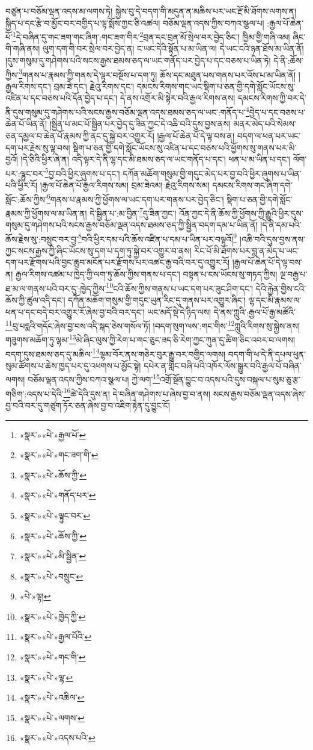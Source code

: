 བཙུན་པ་བཅོམ་ལྡན་འདས་མ་ལགས་ཏེ། སྐྱེས་བུ་དེ་བདག་གི་མདུན་ན་མཆིས་པར་ཡང་རྔོ་མི་ཐོགས་ལགས་ན། སྐྱིད་པ་དང་རྩེ་བ་མྱོང་བར་བགྱིད་པ་ལྟ་སྨོས་ཀྱང་ཅི་འཚལ། བཅོམ་ལྡན་འདས་ཀྱིས་བཀའ་སྩལ་པ། :རྒྱལ་པོ་ཆེན་པོ་\footnote{«སྣར་»«པེ་»རྒྱལ་པོ་}དེ་བཞིན་དུ་གང་ཟག་གང་ཞིག་:གང་ཟག་གིར་\footnote{«སྣར་»«པེ་»གང་ཟག་གི་}བྲན་དང་བྲན་མོ་སྲེལ་བར་བྱེད་ཅིང་། ཁྱིམ་གྱི་གཞི་འམ། ཞིང་གི་གཞི་ནས། ལུག་དག་གི་བར་སྲེལ་བར་བྱེད་ན། ང་ཡང་དེའི་སྟོན་པ་མ་ཡིན་ལ། དེ་ཡང་ངའི་ཉན་ཐོས་མ་ཡིན་ནོ། །དུས་གསུམ་དུ་གཤེགས་པའི་སངས་རྒྱས་ཐམས་ཅད་ལ་ཡང་གནོད་པར་བྱེད་པ་དང་བཅས་པ་ཡིན་ཏེ། དེ་ནི་:ཆོས་ཀྱིས་\footnote{«སྣར་»«པེ་»ཆོས་ཀྱི་}གནས་པ་རྣམས་ཀྱི་གནས་དེ་ལྟར་བསྔོས་པ་དག་ཏུ། ཆོས་དང་མཐུན་པས་གནས་པར་འོས་པ་མ་ཡིན་ནོ། །རྒྱལ་རིགས་དང་། བྲམ་ཟེ་དང་། རྗེའུ་རིགས་དང་། དམངས་རིགས་གང་ཡང་སྡིག་པ་ཅན་གྱི་དགེ་སློང་ཡོངས་སུ་འཛིན་པ་དང་བཅས་པའི་དོན་བྱེད་པ་དང་། དེ་ནས་འགྲོར་མི་སྟེར་བའི་རྒྱལ་རིགས་ནས། དམངས་རིགས་ཀྱི་བར་དེ་ནི་དུས་གསུམ་དུ་གཤེགས་པའི་སངས་རྒྱས་བཅོམ་ལྡན་འདས་ཐམས་ཅད་ལ་ཡང་:གནོད་པ་\footnote{«སྣར་»«པེ་»གནོད་པར་}བྱེད་པ་དང་བཅས་པ་ཆེན་པོ་ཡིན་ནོ། །སྦྱིན་པ་མང་པོ་སྦྱིན་པར་བྱེད་དུ་ཟིན་ཀྱང་དེ་འཆི་བའི་དུས་བྱས་ནས། མནར་མེད་པའི་སེམས་ཅན་དམྱལ་བ་ཆེན་པོ་རྣམས་ཀྱི་ནང་དུ་སྐྱེ་བར་འགྱུར་རོ། །རྒྱལ་པོ་ཆེན་པོ་དེ་ལྟ་བས་ན། བདག་ལ་ཕན་པར་ཡང་དག་པར་རྗེས་སུ་ལྟ་བས། སྡིག་པ་ཅན་གྱི་དགེ་སློང་ཡོངས་སུ་འཛིན་པ་དང་བཅས་པའི་ཕྱོགས་སུ་གནས་པར་མི་བྱའོ། །དེ་ཅིའི་ཕྱིར་ཞེ་ན། འདི་ལྟར་དེ་ནི་ལྷ་དང་མི་ཐམས་ཅད་ལ་ཡང་གནོད་པ་དང་། ཕན་པ་མ་ཡིན་པ་དང་། ལོག་པར་:ལྷུང་བར་\footnote{«སྣར་»«པེ་»ལྟུང་བར་}བྱ་བའི་ཕྱིར་ཞུགས་པ་དང་། དཀོན་མཆོག་གསུམ་གྱི་གདུང་མེད་པར་བྱ་བའི་ཕྱིར་ཞུགས་པ་ཡིན་པའི་ཕྱིར་རོ། །རྒྱལ་པོ་ཆེན་པོ་རྒྱལ་རིགས་སམ། བྲམ་ཟེའམ། རྗེའུ་རིགས་སམ། དམངས་རིགས་གང་ཞིག་དགེ་སློང་:ཆོས་ཀྱིས་\footnote{«སྣར་»«པེ་»ཆོས་ཀྱི་}གནས་པ་རྣམས་ཀྱི་ཕྱོགས་ལ་ཡང་དག་པར་གནས་པར་བྱེད་ཅིང་། སྡིག་པ་ཅན་གྱི་དགེ་སློང་རྣམས་ཀྱི་ཕྱོགས་ལ་མ་ཡིན་ན། དེ་སྦྱིན་པ་:མ་བྱིན་\footnote{«སྣར་»«པེ་»མི་སྦྱིན་}དུ་ཟིན་ཀྱང་། འོན་ཀྱང་དེ་ནི་ཆོས་ཀྱི་ཕྱོགས་ཀྱི་རྒྱུའི་ཕྱིར་དུས་གསུམ་དུ་གཤེགས་པའི་སངས་རྒྱས་བཅོམ་ལྡན་འདས་ཐམས་ཅད་ཀྱི་སྦྱིན་བདག་དམ་པ་ཡིན་ནོ། །དེ་ནི་དམ་པའི་ཆོས་རྗེས་སུ་:བསྲུང་བར་བྱ་\footnote{«སྣར་»«པེ་»བསྲུང་}བའི་ཕྱིར་དམ་པའི་ཆོས་འཛིན་པ་དམ་པ་ཡིན་པར་བལྟའོ།\footnote{«པེ་»ལྟ།} །འཆི་བའི་དུས་བྱས་ནས་ཀྱང་སངས་རྒྱས་ཀྱི་ཞིང་ཡོངས་སུ་དག་པ་དག་ཏུ་སྐྱེ་བར་འགྱུར་བ་ནས། རིང་པོ་མི་ཐོགས་པར་བླ་ན་མེད་པ་ཡང་དག་པར་རྫོགས་པའི་བྱང་ཆུབ་མངོན་པར་རྫོགས་པར་འཚང་རྒྱ་བའི་བར་དུ་འགྱུར་རོ། །རྒྱལ་པོ་ཆེན་པོ་དེ་ལྟ་བས་ན། རྒྱལ་རིགས་འཚམ་པ་ཁྱེད་ཀྱི་ལག་ཏུ་ཆོས་ཀྱིས་གནས་པ་དང་། བསྟན་པ་ངས་ཡོངས་སུ་གཏད་ཀྱིས། ལྔ་བརྒྱ་པ་ཐ་མ་ལ་གནས་པའི་བར་དུ་:ཁྱེད་ཀྱིས་\footnote{«སྣར་»«པེ་»ཁྱེད་ཀྱི་}ངའི་ཆོས་ཀྱིས་གནས་པ་ཡང་དག་པར་ཟུང་ཤིག་དང་། དེའི་རྐྱེན་གྱིས་ངའི་ཆོས་ཀྱི་ཚུལ་འདི་དང་། དཀོན་མཆོག་གསུམ་གྱི་གདུང་ཡུན་རིང་དུ་གནས་པར་འགྱུར་ཞིང་། ལྷ་དང་མི་རྣམས་ལ་ཕན་པ་དང་བདེ་བར་འགྱུར་རོ་ཞེས་བྱ་བའི་བར་དང་། ཡང་མདོ་སྡེ་དེ་ཉིད་ལས། དེ་ནས་ཀླུའི་:རྒྱལ་པོ་རྒྱ་མཚོའི་\footnote{«སྣར་»«པེ་»རྒྱལ་པོའི་}བུ་པདྨའི་གདོང་ཞེས་བྱ་བས་འདི་སྐད་ཅེས་གསོལ་ཏོ། །བདག་སུག་ལས་:གང་གིས་\footnote{«སྣར་»«པེ་»གང་གི་}ཀླུའི་རིགས་སུ་སྐྱེས་ནས། གཟུགས་མཆོག་ཏུ་ལྷམ་\footnote{«སྣར་»«པེ་»ལྷ་}མེ་ཞིང་ལུས་ཀྱི་རེག་པ་གང་ཅུང་ཟད་ཅི་རེག་ཀྱང་ཀུན་དུ་ཚིག་ཅིང་འབར་བ་ལགས། བདག་དུས་ཐམས་ཅད་དུ་མཆིལ་\footnote{«སྣར་»«པེ་»འཆིལ་}ལྷམ་བོར་ནས་གཅེར་བུར་རྒྱུ་བར་བགྱིད་ལགས། བདག་གི་ཕ་དེ་ནི་དཔལ་ཕུན་སུམ་ཚོགས་པ་ཆེས་ཁྱད་པར་དུ་འཕགས་པ་མྱོང་སྟེ། དཔེར་ན་གླིང་བཞི་པའི་འཁོར་ལོས་སྒྱུར་བའི་རྒྱལ་པོ་བཞིན་ལགས། བཅོམ་ལྡན་འདས་ཀྱིས་བཀའ་སྩལ་པ། ཀྱེ་ལག་\footnote{«སྣར་»«པེ་»ལགས་}འགྲོ་སྔོན་བྱུང་བ་འདས་པའི་དུས་བསྐལ་པ་སུམ་ཅུ་རྩ་གཅིག་:འདས་པ་དེའི་\footnote{«སྣར་»«པེ་»འདས་པའི་}ཚེ་དེའི་དུས་ན། དེ་བཞིན་གཤེགས་པ་ཞེས་བྱ་བ་ནས། སངས་རྒྱས་བཅོམ་ལྡན་འདས་ཞེས་བྱ་བའི་བར་དུ་གཙུག་ཏོར་ཅན་ཞེས་བྱ་བ་འཇིག་རྟེན་དུ་བྱུང་ངོ། 